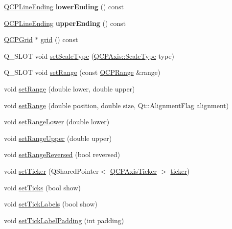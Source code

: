 \begin{DoxyCompactItemize}
\item 
\hyperlink{classQCPLineEnding}{Q\+C\+P\+Line\+Ending} {\bfseries lower\+Ending} () const \hypertarget{classQCPAxis_ac85aebbedf67d7bc9e1e5c182151536b}{}\label{classQCPAxis_ac85aebbedf67d7bc9e1e5c182151536b}

\item 
\hyperlink{classQCPLineEnding}{Q\+C\+P\+Line\+Ending} {\bfseries upper\+Ending} () const \hypertarget{classQCPAxis_aad503ac95ee34e614ffee0bd66473e1a}{}\label{classQCPAxis_aad503ac95ee34e614ffee0bd66473e1a}

\item 
\hyperlink{classQCPGrid}{Q\+C\+P\+Grid} $\ast$ \hyperlink{classQCPAxis_ac4fb913cce3072b5e75a4635e0f6cd04}{grid} () const 
\item 
Q\+\_\+\+S\+L\+OT void \hyperlink{classQCPAxis_adef29cae617af4f519f6c40d1a866ca6}{set\+Scale\+Type} (\hyperlink{classQCPAxis_a36d8e8658dbaa179bf2aeb973db2d6f0}{Q\+C\+P\+Axis\+::\+Scale\+Type} type)
\item 
Q\+\_\+\+S\+L\+OT void \hyperlink{classQCPAxis_aebdfea5d44c3a0ad2b4700cd4d25b641}{set\+Range} (const \hyperlink{classQCPRange}{Q\+C\+P\+Range} \&range)
\item 
void \hyperlink{classQCPAxis_a57d6ee9e9009fe88cb19db476ec70bca}{set\+Range} (double lower, double upper)
\item 
void \hyperlink{classQCPAxis_acf60e5b2d631fbc8c4548c3d579cb6d0}{set\+Range} (double position, double size, Qt\+::\+Alignment\+Flag alignment)
\item 
void \hyperlink{classQCPAxis_afcf51227d337db28d1a9ce9a4d1bc91a}{set\+Range\+Lower} (double lower)
\item 
void \hyperlink{classQCPAxis_acd3ca1247aa867b540cd5ec30ccd3bef}{set\+Range\+Upper} (double upper)
\item 
void \hyperlink{classQCPAxis_a2172fdb196b1a0dc3f40992fcad8e9e1}{set\+Range\+Reversed} (bool reversed)
\item 
void \hyperlink{classQCPAxis_a4ee03fcd2c74d05cd1a419b9af5cfbdc}{set\+Ticker} (Q\+Shared\+Pointer$<$ \hyperlink{classQCPAxisTicker}{Q\+C\+P\+Axis\+Ticker} $>$ \hyperlink{classQCPAxis_acdd672979a52b1f31e2da3518c92616d}{ticker})
\item 
void \hyperlink{classQCPAxis_ac891409315bc379e3b1abdb162c1a011}{set\+Ticks} (bool show)
\item 
void \hyperlink{classQCPAxis_a04ba16e1f6f78d70f938519576ed32c8}{set\+Tick\+Labels} (bool show)
\item 
void \hyperlink{classQCPAxis_af302c479af9dbc2e9f0e44e07c0012ee}{set\+Tick\+Label\+Padding} (int padding)

\end{DoxyCompactItemize}
